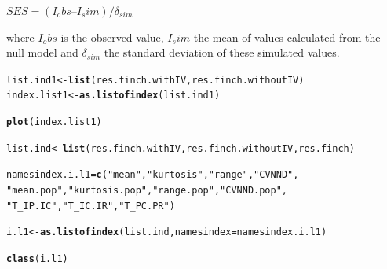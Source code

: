 \documentclass[12pt]{article}\usepackage[]{graphicx}\usepackage[]{color}
\makeatletter
\newcommand{\hlstr}[1]{\textcolor[rgb]{0.192,0.494,0.8}{#1}}%
\newcommand{\hlstd}[1]{\textcolor[rgb]{0.345,0.345,0.345}{#1}}%
\newcommand{\hlkwb}[1]{\textcolor[rgb]{0.69,0.353,0.396}{#1}}%
\newcommand{\hlkwc}[1]{\textcolor[rgb]{0.333,0.667,0.333}{#1}}%
\newcommand{\hlkwd}[1]{\textcolor[rgb]{0.737,0.353,0.396}{\textbf{#1}}}%
\newenvironment{kframe}{%
 \def\at@end@of@kframe{}%
 \ifinner\ifhmode%
  \def\at@end@of@kframe{\end{minipage}}%
  \begin{minipage}{\columnwidth}%
 \fi\fi%
 \def\FrameCommand##1{\hskip\@totalleftmargin \hskip-\fboxsep
 \colorbox{shadecolor}{##1}\hskip-\fboxsep
     \hskip-\linewidth \hskip-\@totalleftmargin \hskip\columnwidth}%
 \MakeFramed {\advance\hsize-\width
   \@totalleftmargin\z@ \linewidth\hsize
   \@setminipage}}%
 {\par\unskip\endMakeFramed%
 \at@end@of@kframe}
\newenvironment{knitrout}{}{} %
\makeatother
\begin{document}
\begin{center}
$SES = (I_obs  I_sim) / \delta_{sim}$
\end{center}

where $I_obs$ is the observed value, $I_sim$ the mean of values calculated from the null model and $\delta_{sim}$ the standard deviation of these simulated values.


\begin{knitrout}
\color{fgcolor}\begin{kframe}
\begin{alltt}
\hlstd{list.ind1}\hlkwb{<-}\hlkwd{list}\hlstd{(res.finch.withIV, res.finch.withoutIV)}
\hlstd{index.list1}\hlkwb{<-}\hlkwd{as.listofindex}\hlstd{(list.ind1)}

\hlkwd{plot}\hlstd{(index.list1)}
\end{alltt}
\end{kframe}
\end{knitrout}

\begin{knitrout}
\color{fgcolor}\begin{kframe}
\begin{alltt}
\hlstd{list.ind}\hlkwb{<-}\hlkwd{list}\hlstd{(res.finch.withIV, res.finch.withoutIV, res.finch)}
\end{alltt}


{\ttfamily\noindent\bfseries\color{errorcolor}{\#\# Error: objet 'res.finch.withIV' introuvable}}\begin{alltt}
\hlstd{namesindex.i.l1} \hlkwb{=} \hlkwd{c}\hlstd{(}\hlstr{"mean"}\hlstd{,} \hlstr{"kurtosis"}\hlstd{,} \hlstr{"range"}\hlstd{,} \hlstr{"CVNND"}\hlstd{,}
         \hlstr{"mean.pop"}\hlstd{,} \hlstr{"kurtosis.pop"}\hlstd{,} \hlstr{"range.pop"}\hlstd{,} \hlstr{"CVNND.pop"}\hlstd{,}
         \hlstr{"T_IP.IC"}\hlstd{,} \hlstr{"T_IC.IR"}\hlstd{,} \hlstr{"T_PC.PR"}\hlstd{)}

\hlstd{i.l1}\hlkwb{<-}\hlkwd{as.listofindex}\hlstd{(list.ind,} \hlkwc{namesindex} \hlstd{= namesindex.i.l1)}
\end{alltt}


{\ttfamily\noindent\bfseries\color{errorcolor}{\#\# Error: objet 'list.ind' introuvable}}\begin{alltt}
\hlkwd{class}\hlstd{(i.l1)}
\end{alltt}


{\ttfamily\noindent\bfseries\color{errorcolor}{\#\# Error: objet 'i.l1' introuvable}}\end{kframe}
\end{knitrout}
\end{document}
